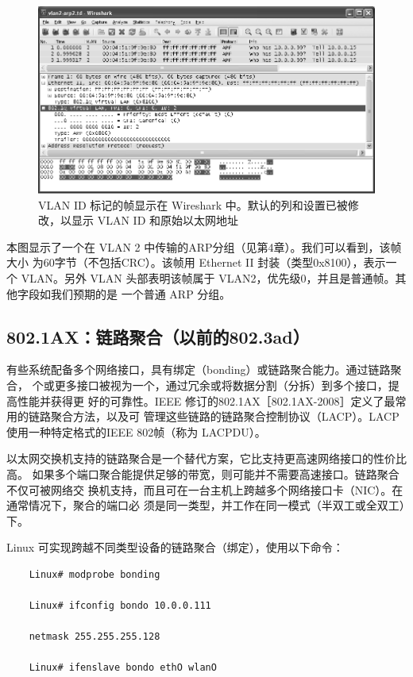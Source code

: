 \begin{figure}
    \centering
    \includegraphics[scale=0.5]{imgs/3/3-5.png}
    \caption{VLAN ID 标记的帧显示在 Wireshark 中。默认的列和设置已被修改，以显示 VLAN ID 和原始以太网地址}
\end{figure}

本图显示了一个在 VLAN 2 中传输的ARP分组（见第4章）。我们可以看到，该帧大小
为60字节（不包括CRC）。该帧用 Ethernet II 封装（类型0x8100），表示一个 VLAN。另外
VLAN 头部表明该帧属于 VLAN2，优先级0，并且是普通帧。其他字段如我们预期的是
一个普通 ARP 分组。

\subsection{802.1AX：链路聚合（以前的802.3ad）}

有些系统配备多个网络接口，具有绑定（bonding）或链路聚合能力。通过链路聚合，
个或更多接口被视为一个，通过冗余或将数据分割（分拆）到多个接口，提高性能并获得更
好的可靠性。IEEE 修订的802.1AX［802.1AX-2008］定义了最常用的链路聚合方法，以及可
管理这些链路的链路聚合控制协议（LACP）。LACP 使用一种特定格式的IEEE 802帧（称为
LACPDU）。

以太网交换机支持的链路聚合是一个替代方案，它比支持更高速网络接口的性价比高。
如果多个端口聚合能提供足够的带宽，则可能并不需要高速接口。链路聚合不仅可被网络交
换机支持，而且可在一台主机上跨越多个网络接口卡（NIC）。在通常情况下，聚合的端口必
须是同一类型，并工作在同一模式（半双工或全双工）下。

Linux 可实现跨越不同类型设备的链路聚合（绑定），使用以下命令：
\begin{verbatim}
    Linux# modprobe bonding
    
    Linux# ifconfig bondo 10.0.0.111
    
    netmask 255.255.255.128
    
    Linux# ifenslave bondo ethO wlanO
\end{verbatim}

